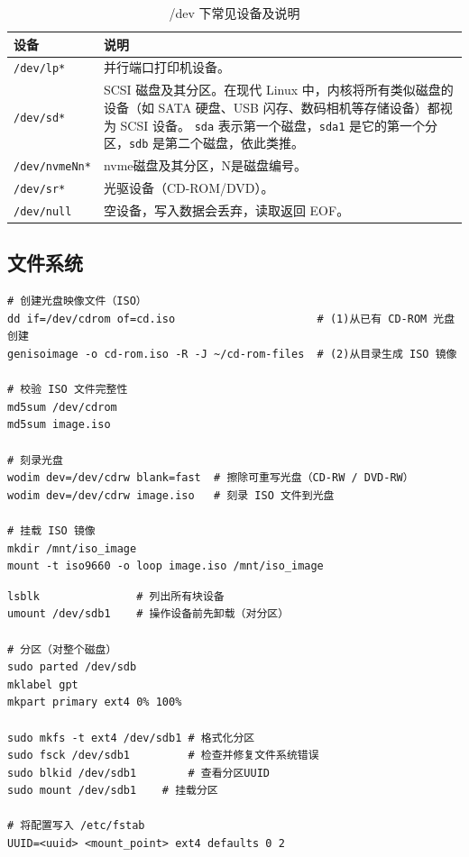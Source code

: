 \begin{table}[H]
	\centering
	\begin{tabular}{|l|p{12cm}|}
		\hline
		\textbf{设备}         & \textbf{说明}                                                                  \\
		\hline
		\verb|/dev/lp*|     & 并行端口打印机设备。                                                                   \\
		\hline
		\verb|/dev/sd*|     & SCSI 磁盘及其分区。在现代 Linux 中，内核将所有类似磁盘的设备（如 SATA 硬盘、USB 闪存、数码相机等存储设备）都视为 SCSI 设备。
		\verb|sda| 表示第一个磁盘，\verb|sda1| 是它的第一个分区，\verb|sdb| 是第二个磁盘，依此类推。                                    \\
		\hline
		\verb|/dev/nvmeNn*| & nvme磁盘及其分区，N是磁盘编号。                                                           \\
		\hline
		\verb|/dev/sr*|     & 光驱设备（CD-ROM/DVD）。                                                            \\
		\hline
		\verb|/dev/null|    & 空设备，写入数据会丢弃，读取返回 EOF。                                                        \\
		\hline
	\end{tabular}
	\caption{/dev 下常见设备及说明}
\end{table}

\subsection{文件系统}

\begin{code}[title=ISO Image]
\begin{verbatim}
# 创建光盘映像文件（ISO）
dd if=/dev/cdrom of=cd.iso						# (1)从已有 CD-ROM 光盘创建	
genisoimage -o cd-rom.iso -R -J ~/cd-rom-files	# (2)从目录生成 ISO 镜像

# 校验 ISO 文件完整性
md5sum /dev/cdrom
md5sum image.iso

# 刻录光盘
wodim dev=/dev/cdrw blank=fast	# 擦除可重写光盘（CD-RW / DVD-RW）
wodim dev=/dev/cdrw image.iso	# 刻录 ISO 文件到光盘

# 挂载 ISO 镜像
mkdir /mnt/iso_image
mount -t iso9660 -o loop image.iso /mnt/iso_image
\end{verbatim}
\end{code}

\begin{code}[title=Disk Partitioning]
	\begin{verbatim}
lsblk				# 列出所有块设备
umount /dev/sdb1	# 操作设备前先卸载（对分区）

# 分区（对整个磁盘）
sudo parted /dev/sdb
mklabel gpt
mkpart primary ext4 0% 100%

sudo mkfs -t ext4 /dev/sdb1	# 格式化分区
sudo fsck /dev/sdb1			# 检查并修复文件系统错误
sudo blkid /dev/sdb1		# 查看分区UUID
sudo mount /dev/sdb1 	# 挂载分区

# 将配置写入 /etc/fstab
UUID=<uuid> <mount_point> ext4 defaults 0 2
\end{verbatim}
\end{code}